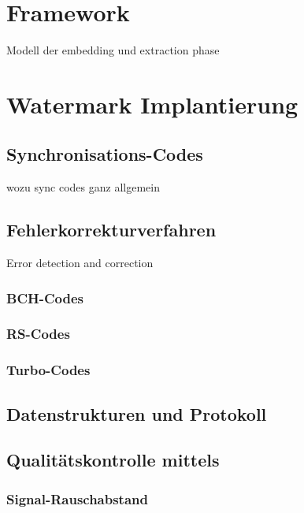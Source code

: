 
\section{Framework}

Modell der embedding und extraction phase

\section{Watermark Implantierung}

\subsection{Synchronisations-Codes}

wozu sync codes ganz allgemein

\subsection{Fehlerkorrekturverfahren}

Error detection and correction

\subsubsection{BCH-Codes}

\subsubsection{RS-Codes}

\subsubsection{Turbo-Codes}

\subsection{Datenstrukturen und Protokoll}

\subsection{Qualitätskontrolle mittels }

\subsubsection{Signal-Rauschabstand}

